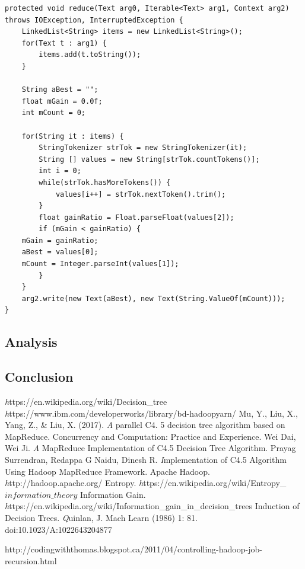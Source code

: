 \documentclass{article}
\begin{document}
\begin{lstlisting}[caption={Attrib Selection Reducer 2 code snippet},label={lst:attrselred},style=MyJavaStyle]
protected void reduce(Text arg0, Iterable<Text> arg1, Context arg2)
throws IOException, InterruptedException {
    LinkedList<String> items = new LinkedList<String>();
    for(Text t : arg1) {
        items.add(t.toString());
    }

    String aBest = "";
    float mGain = 0.0f;
    int mCount = 0;

    for(String it : items) {
        StringTokenizer strTok = new StringTokenizer(it);
        String [] values = new String[strTok.countTokens()];
        int i = 0;
        while(strTok.hasMoreTokens()) {
            values[i++] = strTok.nextToken().trim();
        }
        float gainRatio = Float.parseFloat(values[2]);
        if (mGain < gainRatio) {
	mGain = gainRatio;
	aBest = values[0];
	mCount = Integer.parseInt(values[1]);
        }
    }
    arg2.write(new Text(aBest), new Text(String.ValueOf(mCount)));
}
\end{lstlisting}

\subsection{Analysis}

\subsection{Conclusion}

\begin{thebibliography}{9}
\textit https://en.wikipedia.org/wiki/Decision\_tree
\textit https://www.ibm.com/developerworks/library/bd-hadoopyarn/
Mu, Y., Liu, X., Yang, Z., \& Liu, X. (2017).
\textit A parallel C4. 5 decision tree algorithm based on MapReduce. Concurrency and Computation: Practice and Experience.
Wei Dai, Wei Ji.
\textit A MapReduce Implementation of C4.5 Decision Tree Algorithm.
Prayag Surrendran, Redappa G Naidu, Dinesh R.
\textit Implementation of C4.5 Algorithm Using Hadoop MapReduce Framework.
Apache Hadoop.
\textit http://hadoop.apache.org/
Entropy.
\textit https://en.wikipedia.org/wiki/Entropy\_\(information\_theory\)
Information Gain.
\textit https://en.wikipedia.org/wiki/Information\_gain\_in\_decision\_trees
Induction of Decision Trees.
\textit Quinlan, J. Mach Learn (1986) 1: 81. doi:10.1023/A:1022643204877
\end{thebibliography}
http://codingwiththomas.blogspot.ca/2011/04/controlling-hadoop-job-recursion.html
\end{document}
